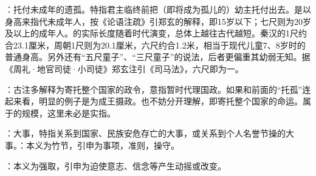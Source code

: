 {
\item {}：托付未成年的遗孤。特指君主临终前把（即将成为孤儿的）幼主托付出去。是以身高来指代未成年人，按《论语注疏》引郑玄的解释，即15岁以下；七尺则为20岁及以上的成年人。的实际长度随着时代演变，总体上越往古代越短。秦汉的1尺约合23.1厘米，周朝1尺则为20.1厘米，六尺约合1.2米，相当于现代儿童7、8岁时的普通身高。另外还有“五尺童子”、“三尺童子”的说法，后者更偏重其幼弱无知。据《周礼·地官司徒·小司徒》郑玄注引《司马法》，六尺即为一。

\item {}：古注多解释为寄托整个国家的政令，意指暂时代理国政。如果和前面的“托孤”连起来看，明显的例子是为成王摄政。也不妨分开理解，即寄托整个国家的命运。属于的规模，这里未必是实指。

\item {}：大事，特指关系到国家、民族安危存亡的大事，或关系到个人名誉节操的大事。：本义为竹节，引申为事项，准则，操守。

\item {}：本义为强取，引申为迫使意志、信念等产生动摇或改变。
}
{}


